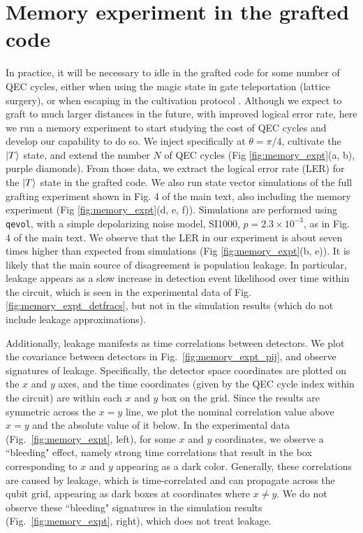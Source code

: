 \section{Memory experiment in the grafted code}
In practice, it will be necessary to idle in the grafted code for some number of QEC cycles, either when using the magic state in gate teleportation (lattice surgery), or when escaping in the cultivation protocol \cite{gidney_magic_2024}. Although we expect to graft to much larger distances in the future, with improved logical error rate, here we run a memory experiment to start studying the cost of QEC cycles and develop our capability to do so. We inject specifically at $\theta = \pi/4$, cultivate the $\ket{T}$ state, and extend the number $N$ of QEC cycles (Fig \ref{fig:memory_expt}(a, b), purple diamonds). From those data, we extract the logical error rate (LER) for the $\ket{T}$ state in the grafted code. We also run state vector simulations of the full grafting experiment shown in Fig. 4 of the main text, also including the memory experiment (Fig \ref{fig:memory_expt}(d, e, f)). Simulations are performed using {\tt qevol}, with a simple depolarizing noise model, SI1000, $p = 2.3\times10^{-3}$, as in Fig. 4 of the main text. We observe that the LER in our experiment is about seven times higher than expected from simulations (Fig \ref{fig:memory_expt}(b, e)). It is likely that the main source of disagreement is population leakage. In particular, leakage appears as a slow increase in detection event likelihood over time within the circuit, which is seen in the experimental data of Fig. \ref{fig:memory_expt_detfracs}, but not in the simulation results (which do not include leakage approximations). 

Additionally, leakage manifests as time correlations between detectors. We plot the covariance between detectors in Fig.~\ref{fig:memory_expt_pij}, and observe signatures of leakage. Specifically, the detector space coordinates are plotted on the $x$ and $y$ axes, and the time coordinates (given by the QEC cycle index within the circuit) are within each $x$ and $y$ box on the grid. Since the results are symmetric across the $x=y$ line, we plot the nominal correlation value above $x=y$ and the absolute value of it below. In the experimental data (Fig.~\ref{fig:memory_expt}, left), for some $x$ and $y$ coordinates, we observe a ``bleeding" effect, namely strong time correlations that result in the box corresponding to $x$ and $y$ appearing as a dark color. Generally, these correlations are caused by leakage, which is time-correlated and can propagate across the qubit grid, appearing as dark boxes at coordinates where $x \neq y$. We do not observe these ``bleeding" signatures in the simulation results (Fig.~\ref{fig:memory_expt}, right), which does not treat leakage. 

